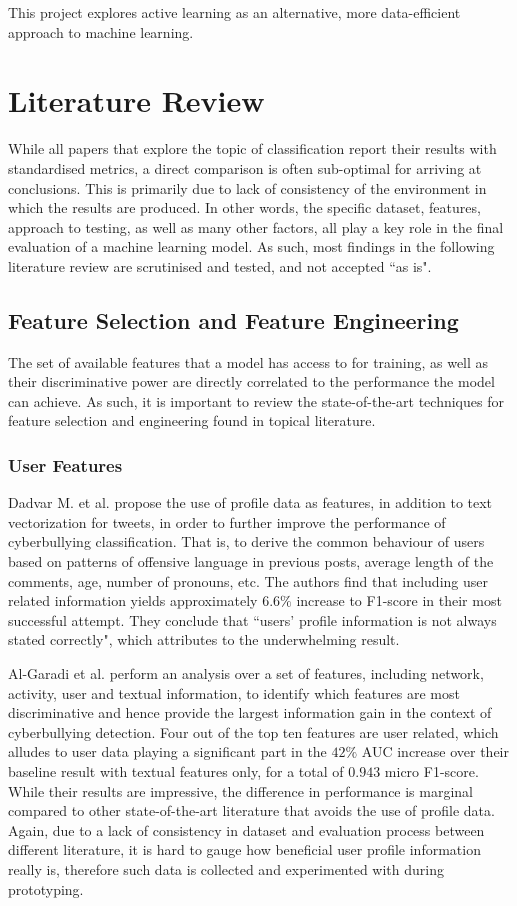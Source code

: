 \documentclass[a4paper,12pt]{article}
\begin{document}
This project explores active learning as an alternative, more data-efficient approach to machine learning.
\section{Literature Review}
\label{section:litrev}
While all papers that explore the topic of classification report their results with standardised metrics, a direct comparison is often sub-optimal for arriving at conclusions. This is primarily due to lack of consistency of the environment in which the results are produced. In other words, the specific dataset, features, approach to testing, as well as many other factors, all play a key role in the final evaluation of a machine learning model. As such, most findings in the following literature review are scrutinised and tested, and not accepted ``as is".
\subsection{Feature Selection and Feature Engineering}
\label{section:features}
The set of available features that a model has access to for training, as well as their discriminative power are directly correlated to the performance the model can achieve. As such, it is important to review the state-of-the-art techniques for feature selection and engineering found in topical literature.
\subsubsection{User Features}
Dadvar M. et al. \cite{Dadvar2013} propose the use of profile data as features, in addition to text vectorization for tweets, in order to further improve the performance of cyberbullying classification. That is, to derive the common behaviour of users based on patterns of offensive language in previous posts, average length of the comments, age, number of pronouns, etc. The authors find that including user related information yields approximately $6.6\%$ increase to F1-score in their most successful attempt. They conclude that ``users' profile information is not always stated correctly", which attributes to the underwhelming result.

Al-Garadi et al. \cite{garadi-highestf/top10features} perform an analysis over a set of features, including network, activity, user and textual information, to identify which features are most discriminative and hence provide the largest information gain in the context of cyberbullying detection. Four out of the top ten features are user related, which alludes to user data playing a significant part in the $42\%$ AUC increase over their baseline result with textual features only, for a total of $0.943$ micro F1-score. While their results are impressive, the difference in performance is marginal compared to other state-of-the-art literature that avoids the use of profile data. Again, due to a lack of consistency in dataset and evaluation process between different literature, it is hard to gauge how beneficial user profile information really is, therefore such data is collected and experimented with during prototyping.
\end{document}
